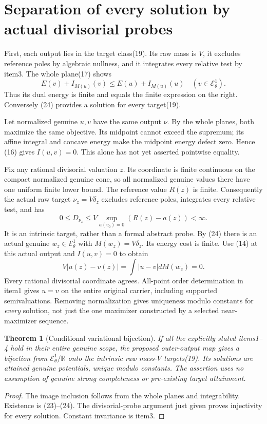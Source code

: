 \documentclass[11pt]{article}
\newtheorem{theorem}{Theorem}
\newcommand{\EE}{\mathcal E^1_\theta}
\begin{document}
\section{Separation of every solution by actual divisorial probes}
First, each output lies in the target class(19). Its raw mass is $V$,
it excludes reference poles by algebraic nullness, and it integrates
every relative test by item3. The whole plane(17) shows
\[
 E(v)+I_{M(u)}(v)\leq E(u)+I_{M(u)}(u)\quad(v\in\EE).
\]
Thus its dual energy is finite and equals the finite expression on
the right. Conversely (24) provides a solution for every target(19).

Let normalized genuine $u,v$ have the same output $\nu$.
By the whole planes, both maximize the same objective. Its midpoint
cannot exceed the supremum; its affine integral and concave energy
make the midpoint energy defect zero. Hence (16) gives $I(u,v)=0$.
This alone has not yet asserted pointwise equality.

Fix any rational divisorial valuation $z$. Its coordinate is finite
continuous on the compact normalized genuine cone, so all normalized
genuine values there have one uniform finite lower bound.
The reference value $R(z)$ is finite. Consequently the actual raw
target $\nu_z=V\delta_z$ excludes reference poles, integrates every
relative test, and has
\[
 0\leq D_{\nu_z}\leq V\sup_{a(v_0)=0}(R(z)-a(z))<\infty.
\]
It is an intrinsic target, rather than a formal abstract probe.
By (24) there is an actual genuine $w_z\in\EE$ with
$M(w_z)=V\delta_z$. Its energy cost is finite.
Use (14) at this actual output and $I(u,v)=0$ to obtain
\[
 V|u(z)-v(z)|=\int|u-v|dM(w_z)=0.
\]
Every rational divisorial coordinate agrees. All-point order
determination in item1 gives $u=v$ on the entire original carrier,
including supported semivaluations. Removing normalization gives
uniqueness modulo constants for \emph{every} solution, not just the
one maximizer constructed by a selected near-maximizer sequence.

\begin{theorem}[Conditional variational bijection]
If all the explicitly stated items1--4 hold in their entire genuine
scope, the proposed outer-output map gives a bijection from
$\EE/\mathbb R$ onto the intrinsic raw mass-$V$ targets(19).
Its solutions are attained genuine potentials, unique modulo constants.
The assertion uses no assumption of genuine strong completeness or
pre-existing target attainment.
\end{theorem}
\begin{proof}
The image inclusion follows from the whole planes and integrability.
Existence is (23)--(24). The divisorial-probe argument just given
proves injectivity for every solution. Constant invariance is item3.
\end{proof}
\end{document}

